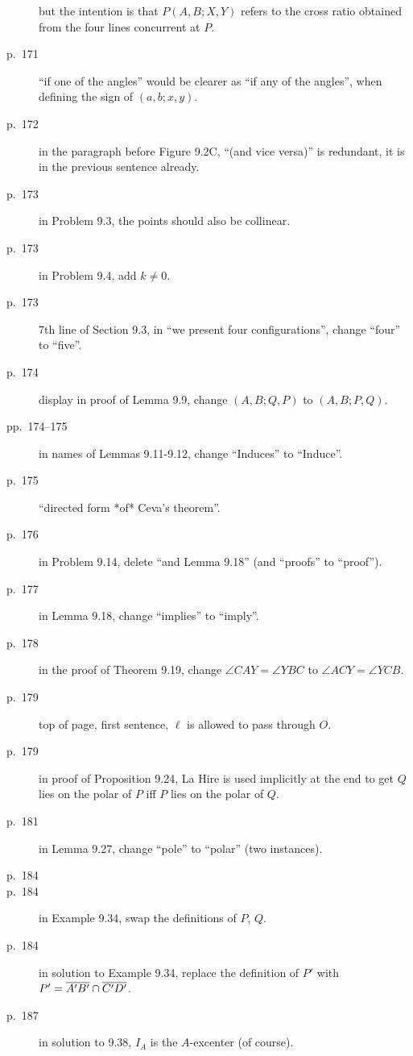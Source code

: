 \documentclass[11pt]{scrartcl}
\begin{document}
\begin{description}
  but the intention is that $P(A,B;X,Y)$ refers to the cross ratio obtained
  from the four lines concurrent at $P$.
\item[p.\  171] ``if one of the angles'' would be clearer as ``if any of the
  angles'', when defining the sign of $(a,b;x,y)$.
\item[p.\  172] in the paragraph before Figure 9.2C,
  ``(and vice versa)'' is redundant, it is in the previous sentence already.
\item[p.\  173] in Problem 9.3, the points should also be collinear.
\item[p.\  173] in Problem 9.4, add $k \neq 0$.
\item[p.\  173] 7th line of Section 9.3, in ``we present four configurations'',
  change ``four'' to ``five''.
\item[p.\  174] display in proof of Lemma 9.9, change $(A,B;Q,P)$ to $(A,B;P,Q)$.
\item[pp.\  174--175] in names of Lemmas 9.11-9.12,
  change ``Induces'' to ``Induce''.
\item[p.\  175] ``directed form *of* Ceva's theorem''.
\item[p.\  176] in Problem 9.14, delete ``and Lemma 9.18'' (and ``proofs'' to ``proof'').
\item[p.\  177] in Lemma 9.18, change ``implies'' to ``imply''.
\item[p.\  178] in the proof of Theorem 9.19, change $\angle CAY = \angle YBC$ to $\angle ACY = \angle YCB$.
\item[p.\  179] top of page, first sentence, $\ell$ is allowed to pass through $O$.
\item[p.\  179] in proof of Proposition 9.24, La Hire is used implicitly at the end
  to get $Q$ lies on the polar of $P$ iff $P$ lies on the polar of $Q$.
\item[p.\  181] in Lemma 9.27, change ``pole'' to ``polar'' (two instances).
\item[p.\  184] 
\item[p.\  184] in Example 9.34, swap the definitions of $P$, $Q$.
\item[p.\  184] in solution to Example 9.34,
  replace the definition of $P'$ with $P' = \overline{A'B'} \cap \overline{C'D'}$.
\item[p.\  187] in solution to 9.38, $I_A$ is the $A$-excenter (of course).

\end{description}
\end{document}
